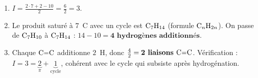 \documentclass[11pt,a4paper]{article}
\begin{document}
\begin{corrige}
\begin{enumerate}[label=\alph*)]
  \item $I=\frac{2\cdot7+2-10}{2}=\frac{6}{2}=3$.
  \item Le produit saturé à $7$~C avec un cycle est $\ce{C7H14}$ (formule $\ce{C_nH_{2n}}$). On passe de $\ce{C7H10}$ à $\ce{C7H14}$ : $14-10=\textbf{4 hydrogènes additionnés}$.
  \item Chaque $\ce{C=C}$ additionne $2$~H, donc $\frac{4}{2}=\textbf{2 liaisons }\ce{C=C}$. Vérification : $I=3=\underbrace{2}_{\pi}+\underbrace{1}_{\text{cycle}}$, cohérent avec le cycle qui subsiste après hydrogénation.
\end{enumerate}
\end{corrige}
\end{document}
